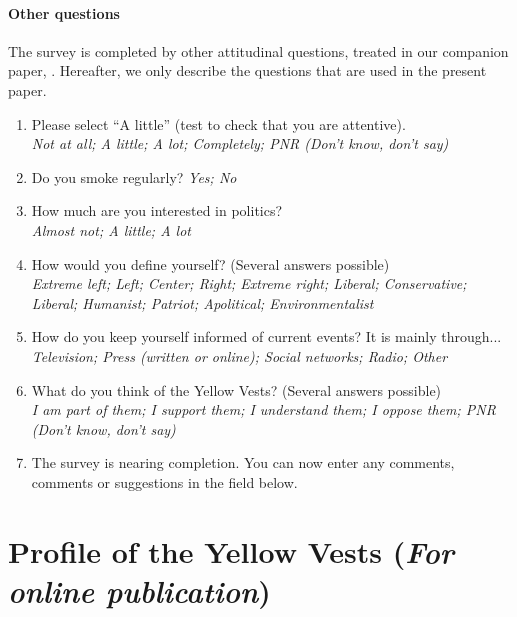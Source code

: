 \documentclass[12pt]{article} %
\begin{document}
\begin{appendices}
\paragraph{Other questions}

The survey is completed by other attitudinal questions, treated in
our companion paper, \citet{douenne_french_2019}. Hereafter, we only describe the questions
that are used in the present paper.
\begin{enumerate}[resume,leftmargin=*]
\item Please select ``A little'' (test to check that you are attentive).
\emph{}\\
\emph{Not at all; A little; A lot; Completely; PNR (Don't know, don't
say)}
\item Do you smoke regularly? \emph{Yes; No}
\item How much are you interested in politics? \emph{}\\
\emph{Almost not; A little; A lot }
\item How would you define yourself? (Several answers possible) \emph{}\\
\emph{Extreme left; Left; Center; Right; Extreme right; Liberal; Conservative;
Liberal; Humanist; Patriot; Apolitical; Environmentalist }
\item How do you keep yourself informed of current events? It is mainly through...
\emph{}\\
\emph{Television; Press (written or online); Social networks; Radio;
Other}
\item What do you think of the Yellow Vests? (Several answers possible)
\emph{}\\
\emph{I am part of them; I support them; I understand them; I oppose
them; PNR (Don't know, don't say)}
\item The survey is nearing completion. You can now enter any comments,
comments or suggestions in the field below.
\end{enumerate}

\clearpage
\section{Profile of the Yellow Vests (\emph{For online publication})} \label{sec:profile_yellow_vests} 


\end{appendices}
\end{document}
